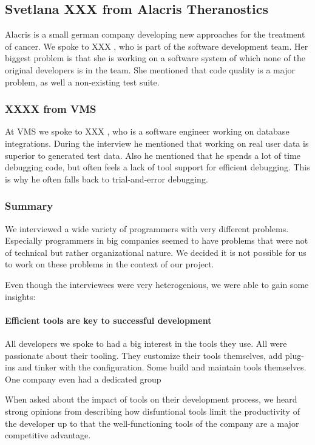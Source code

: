 \subsection{Svetlana XXX from Alacris Theranostics}  Alacris is a small german company developing new approaches for the treatment of cancer. We spoke to XXX , who is part of the software development team. Her biggest problem is that she is working on a software system of which none of the original developers is in the team. She mentioned that code quality is a major problem, as well a non-existing test suite.

\subsubsection{XXXX from VMS} At VMS we spoke to XXX , who is a software engineer working on database integrations. During the interview he mentioned that working on real user data is superior to generated test data. Also he mentioned that he spends a lot of time debugging code, but often feels a lack of tool support for efficient debugging. This is why he often falls back to trial-and-error debugging.

\subsubsection{Summary} We interviewed a wide variety of programmers with very different problems. Especially programmers in big companies seemed to have problems that were not of technical but rather organizational nature. We decided it is not possible for us to work on these problems in the context of our project.

Even though the interviewees were very heterogenious, we were able to gain some insights:

\paragraph{Efficient tools are key to successful development} All developers we spoke to had a big interest in the tools they use. All were passionate about their tooling. They customize their tools themselves, add plug-ins and tinker with the configuration. Some build and maintain tools themselves. One company even had a dedicated group

When asked about the impact of tools on their development process, we heard strong opinions from describing how disfuntional tools limit the productivity of the developer up to that the well-functioning tools of the company are a major competitive advantage.

